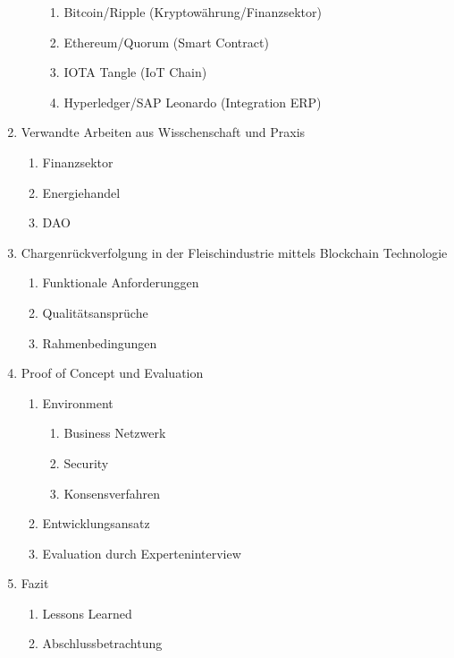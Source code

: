 \begin{small}
\begin{enumerate}
\begin{enumerate}[label*=\arabic*.]
      \begin{enumerate}[label*=\arabic*.]
        \item Bitcoin/Ripple (Kryptowährung/Finanzsektor)
        \item Ethereum/Quorum (Smart Contract)
        \item IOTA Tangle (IoT Chain)
        \item Hyperledger/SAP Leonardo (Integration ERP)
      \end{enumerate}
    \end{enumerate}
    \item Verwandte Arbeiten aus Wisschenschaft und Praxis
    \begin{enumerate}[label*=\arabic*.]
      \item Finanzsektor
      \item Energiehandel
      \item DAO
    \end{enumerate}
    \item Chargenrückverfolgung in der Fleischindustrie mittels Blockchain Technologie
    \begin{enumerate}[label*=\arabic*.]
      \item Funktionale Anforderunggen
      \item Qualitätsansprüche
      \item Rahmenbedingungen
    \end{enumerate}
    \item Proof of Concept und Evaluation
    \begin{enumerate}[label*=\arabic*.]
      \item Environment
      \begin{enumerate}[label*=\arabic*.]
        \item Business Netzwerk
        \item Security
        \item Konsensverfahren
      \end{enumerate}
      \item Entwicklungsansatz
      \item Evaluation durch Experteninterview
    \end{enumerate}
    \item Fazit
    \begin{enumerate}[label*=\arabic*.]
      \item Lessons Learned
      \item Abschlussbetrachtung
    \end{enumerate}
  \end{enumerate}


\end{small}
